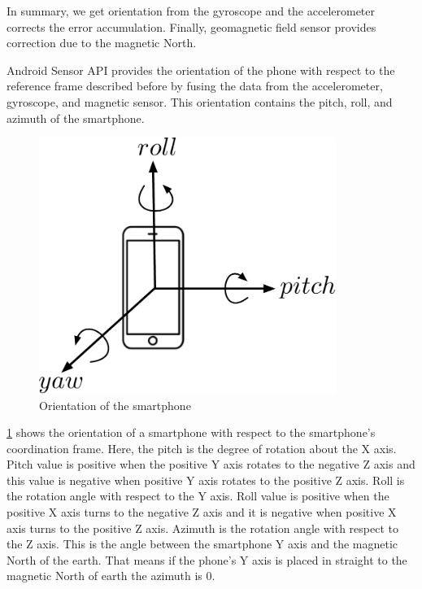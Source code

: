 In summary, we get orientation from the gyroscope and the accelerometer corrects the error accumulation.
Finally, geomagnetic field sensor provides correction due to the magnetic North.

Android Sensor API \cite {api_android} provides the orientation of the phone with respect to the reference frame described before by fusing the data from the accelerometer, gyroscope, and magnetic sensor. 
This orientation contains the pitch, roll, and azimuth of the smartphone. 

%
\begin{figure}
\centering
\includegraphics[width=3.8in]{figures/roll_pitch_yaw.pdf}
\caption{Orientation of the smartphone}
\label{f:rpy_dia}
\end{figure}

\ref{f:rpy_dia} shows the orientation of a smartphone with respect to the smartphone's coordination frame.
Here, the pitch is the degree of rotation about the X axis.
Pitch value is positive when the positive Y axis rotates to the negative Z axis and this value is negative when positive Y axis rotates to the positive Z axis.
Roll is the rotation angle with respect to the Y axis.
Roll value is positive when the positive X axis turns to the negative Z axis and it is negative when positive X axis turns to the positive Z axis.
Azimuth is the rotation angle with respect to the Z axis.
This is the angle between the smartphone Y axis and the magnetic North of the earth.
That means if the phone's Y axis is placed in straight to the magnetic North of earth the azimuth is 0.

